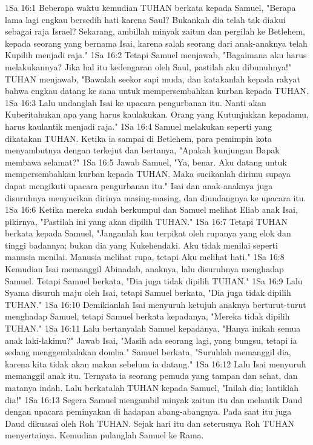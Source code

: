 1Sa 16:1  Beberapa waktu kemudian TUHAN berkata kepada Samuel, "Berapa lama lagi engkau bersedih hati karena Saul? Bukankah dia telah tak diakui sebagai raja Israel? Sekarang, ambillah minyak zaitun dan pergilah ke Betlehem, kepada seorang yang bernama Isai, karena salah seorang dari anak-anaknya telah Kupilih menjadi raja."
1Sa 16:2  Tetapi Samuel menjawab, "Bagaimana aku harus melakukannya? Jika hal itu kedengaran oleh Saul, pastilah aku dibunuhnya!" TUHAN menjawab, "Bawalah seekor sapi muda, dan katakanlah kepada rakyat bahwa engkau datang ke sana untuk mempersembahkan kurban kepada TUHAN.
1Sa 16:3  Lalu undanglah Isai ke upacara pengurbanan itu. Nanti akan Kuberitahukan apa yang harus kaulakukan. Orang yang Kutunjukkan kepadamu, harus kaulantik menjadi raja."
1Sa 16:4  Samuel melakukan seperti yang dikatakan TUHAN. Ketika ia sampai di Betlehem, para pemimpin kota menyambutnya dengan terkejut dan bertanya, "Apakah kunjungan Bapak membawa selamat?"
1Sa 16:5  Jawab Samuel, "Ya, benar. Aku datang untuk mempersembahkan kurban kepada TUHAN. Maka sucikanlah dirimu supaya dapat mengikuti upacara pengurbanan itu." Isai dan anak-anaknya juga disuruhnya menyucikan dirinya masing-masing, dan diundangnya ke upacara itu.
1Sa 16:6  Ketika mereka sudah berkumpul dan Samuel melihat Eliab anak Isai, pikirnya, "Pastilah ini yang akan dipilih TUHAN."
1Sa 16:7  Tetapi TUHAN berkata kepada Samuel, "Janganlah kau terpikat oleh rupanya yang elok dan tinggi badannya; bukan dia yang Kukehendaki. Aku tidak menilai seperti manusia menilai. Manusia melihat rupa, tetapi Aku melihat hati."
1Sa 16:8  Kemudian Isai memanggil Abinadab, anaknya, lalu disuruhnya menghadap Samuel. Tetapi Samuel berkata, "Dia juga tidak dipilih TUHAN."
1Sa 16:9  Lalu Syama disuruh maju oleh Isai, tetapi Samuel berkata, "Dia juga tidak dipilih TUHAN."
1Sa 16:10  Demikianlah Isai menyuruh ketujuh anaknya berturut-turut menghadap Samuel, tetapi Samuel berkata kepadanya, "Mereka tidak dipilih TUHAN."
1Sa 16:11  Lalu bertanyalah Samuel kepadanya, "Hanya inikah semua anak laki-lakimu?" Jawab Isai, "Masih ada seorang lagi, yang bungsu, tetapi ia sedang menggembalakan domba." Samuel berkata, "Suruhlah memanggil dia, karena kita tidak akan makan sebelum ia datang."
1Sa 16:12  Lalu Isai menyuruh memanggil anak itu. Ternyata ia seorang pemuda yang tampan dan sehat, dan matanya indah. Lalu berkatalah TUHAN kepada Samuel, "Inilah dia; lantiklah dia!"
1Sa 16:13  Segera Samuel mengambil minyak zaitun itu dan melantik Daud dengan upacara peminyakan di hadapan abang-abangnya. Pada saat itu juga Daud dikuasai oleh Roh TUHAN. Sejak hari itu dan seterusnya Roh TUHAN menyertainya. Kemudian pulanglah Samuel ke Rama.
